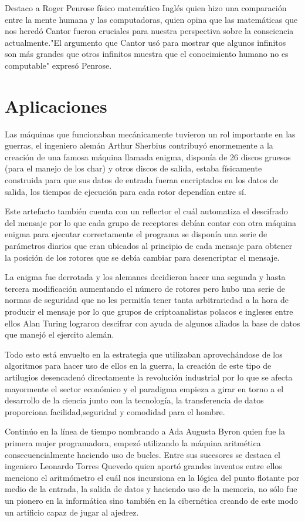 \documentclass[11pt]{article}
\begin{document}
Destaco a Roger Penrose físico matemático Inglés quien hizo una comparación entre la mente humana y las computadoras, quien opina que las matemáticas que nos heredó Cantor fueron cruciales para nuestra perspectiva sobre la consciencia actualmente."El argumento que Cantor usó para mostrar que algunos infinitos son más grandes que otros infinitos muestra que el conocimiento humano no es computable" expresó Penrose.

\section{Aplicaciones}

Las máquinas que funcionaban mecánicamente tuvieron un rol importante en las guerras, el ingeniero alemán Arthur Sherbius contribuyó enormemente a la creación de una famosa máquina llamada enigma, disponía de 26 discos gruesos (para el manejo de los char) y otros discos de salida, estaba físicamente construida para que sus datos de entrada fueran encriptados en los datos de salida, los tiempos de ejecución para cada rotor dependían entre sí.

Este artefacto también cuenta con un reflector el cuál automatiza el descifrado del mensaje por lo que cada grupo de receptores debían contar con otra máquina enigma para ejecutar correctamente el programa se disponía una serie de parámetros diarios que eran ubicados al principio de cada mensaje para obtener la posición de los rotores que se debía cambiar para desencriptar el mensaje.

La enigma fue derrotada y los alemanes decidieron hacer una segunda y hasta tercera modificación aumentando el número de rotores pero hubo una serie de normas de seguridad que no les permitía tener tanta arbitrariedad a la hora de producir el mensaje por lo que grupos de criptoanalistas polacos e ingleses entre ellos Alan Turing lograron descifrar con ayuda de algunos aliados la base de datos que manejó el ejercito alemán.

Todo esto está envuelto en la estrategia que utilizaban aprovechándose de los algoritmos para hacer uso de ellos en la guerra, la creación de este tipo de artilugios desencadenó directamente la revolución industrial por lo que se afecta mayormente el sector económico y el paradigma empieza a girar en torno a el desarrollo de la ciencia junto con la tecnología, la transferencia de datos proporciona facilidad,seguridad y comodidad para el hombre.

Continúo en la línea de tiempo nombrando a Ada Augusta Byron quien fue la primera mujer programadora, empezó utilizando la máquina aritmética consecuencialmente haciendo uso de bucles. Entre sus sucesores se destaca el ingeniero Leonardo Torres Quevedo quien aportó grandes inventos entre ellos menciono el aritmómetro el cuál nos incursiona en la lógica del punto flotante por  medio de la entrada, la salida de datos y haciendo uso de la memoria, no sólo fue un pionero en la informática sino también en la cibernética creando de este modo un artificio capaz de jugar al ajedrez.
\end{document}
